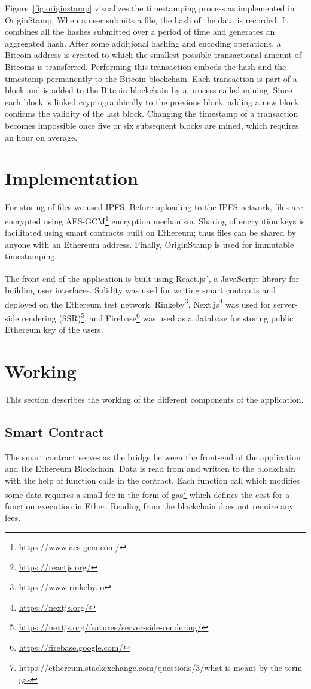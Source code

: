 Figure~\ref{fig:originstamp} visualizes the timestamping process as implemented in OriginStamp. When a user submits a file, the hash of the data is recorded. It combines all the hashes submitted over a period of time and generates an aggregated hash. After some additional hashing and encoding operations, a Bitcoin address is created to which the smallest possible transactional amount of Bitcoins is transferred. Performing this transaction embeds the hash and the timestamp permanently to the Bitcoin blockchain. Each transaction is part of a block and is added to the Bitcoin blockchain by a process called mining. Since each block is linked cryptographically to the previous block, adding a new block confirms the validity of the last block. Changing the timestamp of a transaction becomes impossible once five or six subsequent blocks are mined, which requires an hour on average\cite{nakamoto2008bitcoin}.

\section{Implementation}
For storing of files we used IPFS. Before uploading to the IPFS network, files are encrypted using AES-GCM\footnote{\url{https://www.aes-gcm.com/}} encryption mechanism. Sharing of encryption keys is facilitated using smart contracts built on Ethereum; thus files can be shared by anyone with an Ethereum address. Finally, OriginStamp is used for immutable timestamping.

The front-end of the application is built using React.js\footnote{\url{https://reactjs.org/}}, a JavaScript library for building user interfaces. Solidity was used for writing smart contracts and deployed on the Ethereum test network, Rinkeby\footnote{\url{https://www.rinkeby.io}}. Next.js\footnote{\url{https://nextjs.org/}} was used for server-side rendering (SSR)\footnote{\url{https://nextjs.org/features/server-side-rendering/}}, and Firebase\footnote{\url{https://firebase.google.com/}} was used as a database for storing public Ethereum key of the users.

\section{Working}
This section describes the working of the different components of the application.

\subsection{Smart Contract}
The smart contract serves as the bridge between the front-end of the application and the Ethereum Blockchain. Data is read from and written to the blockchain with the help of function calls in the contract. Each function call which modifies some data requires a small fee in the form of gas\footnote{\url{https://ethereum.stackexchange.com/questions/3/what-is-meant-by-the-term-gas}} which defines the cost for a function execution in Ether. Reading from the blockchain does not require any fees.

